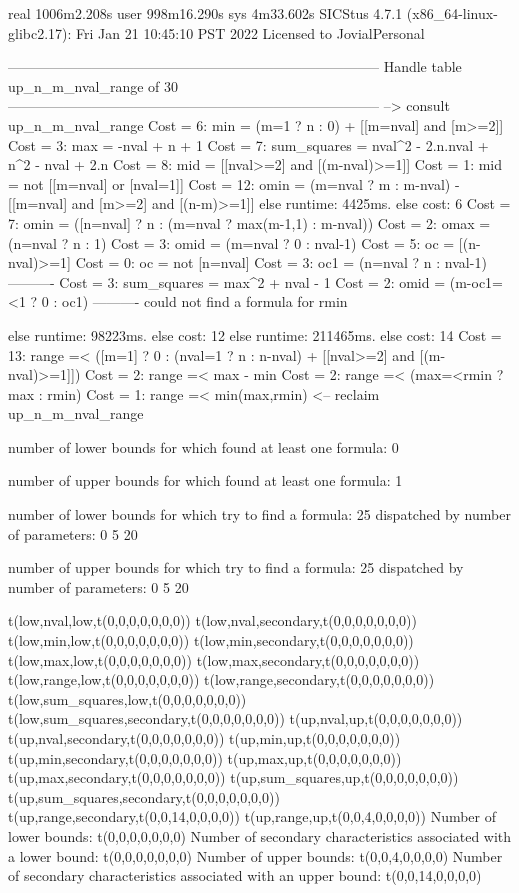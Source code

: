 real	1006m2.208s
user	998m16.290s
sys	4m33.602s
SICStus 4.7.1 (x86_64-linux-glibc2.17): Fri Jan 21 10:45:10 PST 2022
Licensed to JovialPersonal


--------------------------------------------------------------------------------
Handle table up_n_m_nval_range of 30
--------------------------------------------------------------------------------
--> consult up_n_m_nval_range
Cost =  6:  min         = (m=1 ? n : 0) + [[m=nval] and [m>=2]] %
Cost =  3:  max         = -nval + n + 1
Cost =  7:  sum_squares = nval^2 - 2.n.nval + n^2 - nval + 2.n
Cost =  8:  mid         = [[nval>=2] and [(m-nval)>=1]]
Cost =  1:  mid         = not [[m=nval] or [nval=1]]
Cost = 12:  omin        = (m=nval ? m : m-nval) - [[m=nval] and [m>=2] and [(n-m)>=1]] %
else runtime: 4425ms. else cost: 6
Cost =  7:  omin        = ([n=nval] ? n : (m=nval ? max(m-1,1) : m-nval)) %
Cost =  2:  omax        = (n=nval ? n : 1)
Cost =  3:  omid        = (m=nval ? 0 : nval-1)
Cost =  5:  oc          = [(n-nval)>=1]
Cost =  0:  oc          = not [n=nval]
Cost =  3:  oc1         = (n=nval ? n : nval-1)
----------
Cost =  3:  sum_squares = max^2 + nval - 1
Cost =  2:  omid        = (m-oc1=<1 ? 0 : oc1)
----------
could not find a formula for rmin

else runtime: 98223ms. else cost: 12
else runtime: 211465ms. else cost: 14
Cost = 13:  range =< ([m=1] ? 0 : (nval=1 ? n : n-nval) + [[nval>=2] and [(m-nval)>=1]]) %
Cost =  2:  range =< max - min
Cost =  2:  range =< (max=<rmin ? max : rmin)
Cost =  1:  range =< min(max,rmin)
<-- reclaim up_n_m_nval_range

number of lower bounds for which found at least one formula: 0

number of upper bounds for which found at least one formula: 1

number of lower bounds for which try to find a formula: 25
dispatched by number of parameters: 0  5  20

number of upper bounds for which try to find a formula: 25
dispatched by number of parameters: 0  5  20

t(low,nval,low,t(0,0,0,0,0,0,0))
t(low,nval,secondary,t(0,0,0,0,0,0,0))
t(low,min,low,t(0,0,0,0,0,0,0))
t(low,min,secondary,t(0,0,0,0,0,0,0))
t(low,max,low,t(0,0,0,0,0,0,0))
t(low,max,secondary,t(0,0,0,0,0,0,0))
t(low,range,low,t(0,0,0,0,0,0,0))
t(low,range,secondary,t(0,0,0,0,0,0,0))
t(low,sum_squares,low,t(0,0,0,0,0,0,0))
t(low,sum_squares,secondary,t(0,0,0,0,0,0,0))
t(up,nval,up,t(0,0,0,0,0,0,0))
t(up,nval,secondary,t(0,0,0,0,0,0,0))
t(up,min,up,t(0,0,0,0,0,0,0))
t(up,min,secondary,t(0,0,0,0,0,0,0))
t(up,max,up,t(0,0,0,0,0,0,0))
t(up,max,secondary,t(0,0,0,0,0,0,0))
t(up,sum_squares,up,t(0,0,0,0,0,0,0))
t(up,sum_squares,secondary,t(0,0,0,0,0,0,0))
t(up,range,secondary,t(0,0,14,0,0,0,0))
t(up,range,up,t(0,0,4,0,0,0,0))
Number of lower bounds:                                             t(0,0,0,0,0,0,0)
Number of secondary characteristics associated with a lower bound:  t(0,0,0,0,0,0,0)
Number of upper bounds:                                             t(0,0,4,0,0,0,0)
Number of secondary characteristics associated with an upper bound: t(0,0,14,0,0,0,0)

